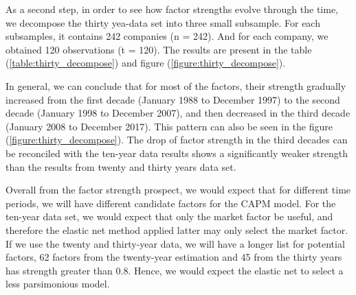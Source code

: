 As a second step, in order to see how factor strengths evolve through the time, we decompose the thirty yea-data set into three small subsample.
For each subsamples, it contains 242 companies (n = 242). 
And for each company, we obtained 120 observations (t = 120). 
The results are present in the table (\ref{table:thirty_decompose}) and figure (\ref{figure:thirty_decompose}).

In general, we can conclude that for most of the factors, their strength gradually increased from the first decade (January 1988 to December 1997) to the second decade (January 1998 to December 2007), and then decreased in the third decade (January 2008 to December 2017).
This pattern can also be seen in the figure (\ref{figure:thirty_decompose}).
The drop of factor strength in the third decades can be reconciled with the ten-year data results shows a significantly weaker strength than the results from twenty and thirty years data set.





Overall from the factor strength prospect, we would expect that for different time periods, we will have different candidate factors for the CAPM model.
For the ten-year data set, we would expect that only the market factor be useful, and therefore the elastic net method applied latter may only select the market factor.
If we use the twenty and thirty-year data, we will have a longer list for potential factors, 62 factors from the twenty-year estimation and 45 from the thirty years has strength greater than 0.8.
Hence, we would expect the elastic net to select a less parsimonious model. 

